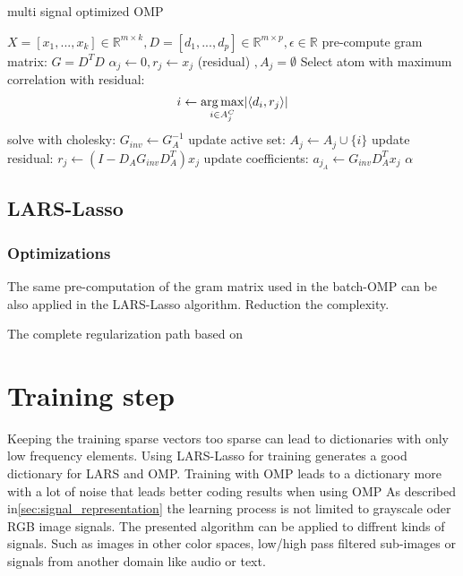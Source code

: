 \begin{algorithm}
\caption{multi signal optimized OMP}
\label{alg:batchOMP}
\begin{algorithmic}[1]
\REQUIRE $X =[x_1,...,x_k]  \in \mathbb{R}^{m \times k}, D  =[d_1,...,d_p]  \in \mathbb{R}^{m\times p}, \epsilon \in \mathbb{R}$
\STATE pre-compute gram matrix: $G=D^TD$
\STATE $\alpha_j \gets 0, r_j \gets x_j $ (residual) $, A_j=\emptyset$
\STATE Select atom with maximum correlation with residual: 
\begin{equation*}
i \gets \operatorname*{arg\,max}_{i \in A_j^C} \lvert \left<d_i,r_j\right> \rvert
\end{equation*}
\STATE solve with cholesky: $G_{inv} \gets G_A^{-1}$
\STATE update active set: $A_j \gets A_j \cup \{i\} $
\STATE update residual: $r_j \gets \left(I-D_AG_{inv}D_A^T \right)x_j$
\STATE update coefficients: $a_{j_A} \gets G_{inv} D_A^T x_j $
\ENDFOR 
\ENDFOR 
\RETURN $\alpha$
\end{algorithmic}
\end{algorithm}


\subsection{LARS-Lasso}
\subsubsection*{Optimizations}
The same pre-computation of the gram matrix used in the batch-OMP can be
also applied in the LARS-Lasso algorithm. Reduction the complexity. %

The complete regularization path based on\cite{Efron2004}


\section{Training step}
Keeping the training sparse vectors too sparse can lead to dictionaries with
only low frequency elements. Using LARS-Lasso for training generates a good
dictionary for LARS and OMP. Training with OMP leads to a dictionary more with a
lot of noise that leads better coding results when using OMP 
As described in\ref{sec:signal_representation} the learning process is not
limited to grayscale oder RGB image signals. The presented algorithm can be
applied to diffrent kinds of signals. Such as images in other color
spaces, low/high pass filtered sub-images or signals from another domain like
audio or text. 


